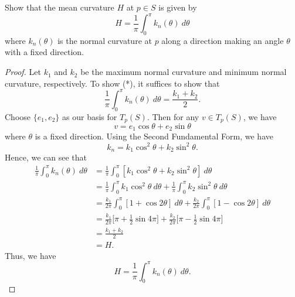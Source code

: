 \documentclass[a4paper]{article}
\begin{document}
\begin{problem}
    Show that the mean curvature \( H  \) at \( p \in S  \) is given by
    \[  H = \frac{ 1 }{ \pi }  \int_{ 0 }^{ \pi  }  {k}_{n}(\theta) \ d\theta \tag{*} \] where \( {k}_{n}(\theta) \) is the normal curvature at \( p  \) along a direction making an angle \( \theta  \) with a fixed direction.
\end{problem}
\begin{proof}
Let \( {k}_{1} \) and \( {k}_{2} \) be the maximum normal curvature and minimum normal curvature, respectively. To show (*), it suffices to show that 
\[  \frac{ 1 }{ \pi  }  \int_{ 0  }^{ \pi  }  {k }_{n}(\theta) \ d\theta = \frac{ {k}_{1} + {k}_{2}  }{ 2  }. \]
Choose \( \{ {e}_{1}, {e}_{2} \}   \) as our basis for \( {T}_{p}(S) \). Then for any \( v \in {T}_{p}(S) \), we have 
\[  v = {e}_{1} \cos \theta + {e}_{2} \sin \theta  \]
where \( \theta  \) is a fixed direction. Using the Second Fundamental Form, we have
\[  {k}_{n} = {k}_{1} \cos^{2}\theta + {k}_{2} \sin^{2} \theta.  \]
Hence, we can see that 
\begin{align*}
    \frac{ 1 }{ \pi  }  \int_{ 0  }^{ \pi  }  {k }_{n}(\theta) \ d\theta &= \frac{ 1 }{ \pi  }  \int_{ 0 }^{ \pi  } [{k}_{1} \cos^{2} \theta + {k}_{2} \sin^{2} \theta ]  \ d\theta  \\
                                                                         &= \frac{ 1 }{ \pi  }  \int_{ 0 }^{ \pi  }  {k }_{1} \cos^{2} \theta  \ d \theta + \frac{ 1 }{ \pi  }  \int_{ 0 }^{  \pi  } {k}_{2} \sin^{2} \theta  \ d \theta \\
                                                                         &= \frac{ {k}_{1}  }{ 2 \pi  }  \int_{ 0 }^{ \pi  }  [1 + \cos 2 \theta] \ d\theta + \frac{ {k}_{2}  }{ 2 \pi  }  \int_{ 0  }^{  \pi  }  [1 - \cos 2 \theta ] \ d \theta \\ 
                                                                         &=\frac{ {k}_{1} }{ 2 \pi  }  \Big[ \pi + \frac{ 1 }{ 2 } \sin 4 \pi \Big] + \frac{ {k }_{2}  }{  2 \pi  } \Big[\pi - \frac{ 1 }{ 2 } \sin 4 \pi \Big] \\
                                                                         &= \frac{ {k}_{1} + {k}_{2}  }{  2  } \\
                                                                         &= H.
\end{align*}
Thus, we have 
\[  H = \frac{ 1 }{ \pi  }  \int_{ 0  }^{  \pi  }  {k}_{n}(\theta) \ d \theta. \]
\end{proof}
\end{document}
